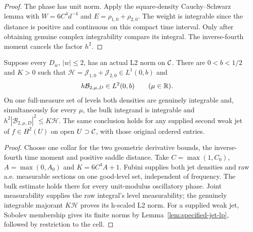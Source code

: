 \begin{proof}
\leanok
The phase has unit norm.
Apply the square-density Cauchy--Schwarz lemma with
$W=6C^4d^{-4}$ and $E=\rho_{1,0}+\rho_{2,0}$.
The weight is integrable since the distance is positive and continuous
on this compact time interval.
Only after obtaining genuine complex integrability compare its integral.
The inverse-fourth moment cancels the factor $h^2$.
\end{proof}

\begin{lemma}
\label{lem:second-numerator-bulk}
\leanok
Suppose every $D_w$, $|w|\le2$, has an actual L2 norm on $\mathcal{C}$.
There are $0<b<1/2$ and $K>0$ such that
$\mathcal H=\mathcal J_{1,0}+\mathcal J_{2,0}\in L^1(0,b)$ and
\[
 h\mathcal B_{2,\mu,D}\in L^2(0,b)\qquad(\mu\in\mathbb{R}).
\]
On one full-measure set of levels both densities are genuinely
integrable and, simultaneously for every $\mu$, the bulk integrand is
integrable and $h^2|\mathcal B_{2,\mu,D}|^2\le K\mathcal H$.
The same conclusion holds for any supplied second weak jet of
$f\in H^2(U)$ on open $U\supset\mathcal{C}$, with those original ordered entries.
\end{lemma}

\begin{proof}
\leanok
Choose one collar for the two geometric derivative bounds,
the inverse-fourth time moment and positive saddle distance.
Take $C=\max(1,C_0)$, $A=\max(0,A_0)$ and $K=6C^4A+1$.
Fubini supplies both jet densities and raw a.e. measurable sections on
one good-level set, independent of frequency.
The bulk estimate holds there for every unit-modulus oscillatory phase.
Joint measurability supplies the raw integral's level measurability;
the genuinely integrable majorant $K\mathcal H$ proves its h-scaled L2 norm.
For a supplied weak jet, Sobolev membership gives its finite norms by
Lemma~\ref{lem:specified-jet-lp}, followed by restriction to the cell.
\end{proof}

